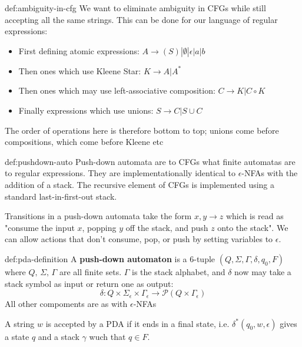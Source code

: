 \documentclass[landscape, 8pt]{extarticle}
\begin{document}
\begin{multicols}{3}
\begin{dfn}{def:ambiguity-in-cfg}{}
We want to eliminate ambiguity in CFGs while still accepting all the same strings. This can be done for our language of regular expressions:
\renewcommand\labelitemi{\tiny$\bullet$}
\begin{itemize}
    \setlength\itemsep{0em}
    \item First defining atomic expressions: $A\to (S) | \emptyset | \epsilon | a | b$
    \item Then ones which use Kleene Star: $K \to A | A^{*}$
    \item Then ones which may use left-associative composition: $C\to K | C\circ K$
    \item Finally expressions which use unions: $S\to C | S\cup C$
\end{itemize}
The order of operations here is therefore bottom to top; unions come before compositions, which come before Kleene etc
\end{dfn}

\begin{dfn}{def:pushdown-auto}{}
Push-down automata are to CFGs what finite automatas are to regular expressions. They are implementationally identical to $\epsilon$-NFAs with the addition of a stack. The recursive element of CFGs is implemented using a standard last-in-first-out stack.

Transitions in a push-down automata take the form $x,y\to z$ which is read as "consume the input $x$, popping $y$ off the stack, and push $z$ onto the stack". We can allow actions that don't consume, pop, or push by setting variables to $\epsilon$.
\end{dfn}

\begin{dfn}{def:pda-definition}{}
A \textbf{push-down automaton} is a $6$-tuple $(Q, \Sigma, \Gamma, \delta, q_{0}, F)$ where $Q,\,\Sigma,\,\Gamma$ are all finite sets. $\Gamma$ is the stack alphabet, and $\delta$ now may take a stack symbol as input or return one as output:
\[\delta : Q \times \Sigma_{\epsilon} \times \Gamma_{\epsilon}\to \mathcal{P}(Q \times \Gamma_{\epsilon})\]
All other compoments are as with $\epsilon$-NFAs

A string $w$ is accepted by a PDA if it ends in a final state, i.e. $\delta^{*}(q_{0}, w, \epsilon)$ gives a state $q$ and a stack $\gamma$ wuch that $q\in F$.

\end{dfn}


\end{multicols}
\end{document}
